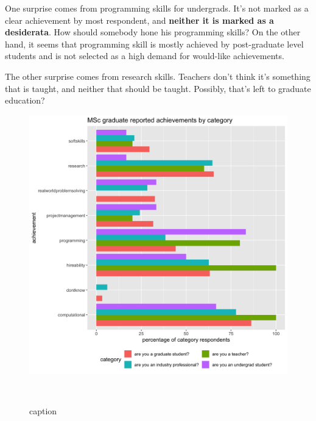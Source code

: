 \documentclass{sigchi}
\begin{document}
One surprise comes from programming skills for undergrads. It's not marked as a clear achievement by most respondent, and \textbf{neither it is marked as a desiderata}. How should somebody hone his programming skills? On the other hand, it seems that programming skill is mostly achieved by post-graduate level students and is not selected as a high demand for would-like achievements. 

The other surprise comes from research skills. Teachers don't think it's something that is taught, and neither that should be taught. Possibly, that's left to graduate education?\newline

\begin{figure}
 \includegraphics[scale=0.2]{../data-analysis/plots_output/MSc_graduate_reported_achievements_by_category.png}
  \caption{caption}~\label{fig:figure3}
\end{figure}
\end{document}
